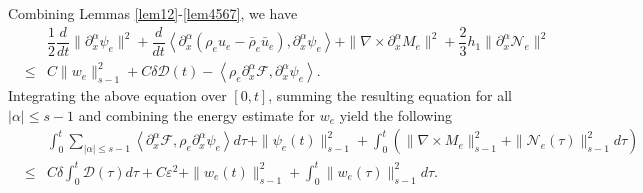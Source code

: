 \documentclass[reqno,twoside,12pt,a4paper]{amsart}
\newcommand{\eps}{\mathbb{\varepsilon}}
\newcommand{\al}{\alpha}
\newcommand{\pa}{\partial}
\newcommand{\D}{\nabla}
\newcommand{\calf}{\mathcal{F}}
\newcommand{\Ne}{\mathcal{N}_e}
\numberwithin{equation}{section}
\begin{document}
Combining Lemmas \ref{lem12}-\ref{lem4567}, we have
\begin{eqnarray*}
&&\dfrac{1}{2}\dfrac{d}{dt}\|\pa_x^\al \psi_e\|^2+\dfrac{d}{dt}\left<\partial^\al_x (\rho_e u_e-\bar{\rho}_e\bar{u}_e), \pa_x^\al\psi_e\right>+\|\D\times \pa_x^\al M_e\|^2+\dfrac{2}{3}h_1\|\pa_x^\al \Ne\|^2\nonumber\\
&\leq& C\|w_e\|_{s-1}^2+C\delta\mathcal{D}(t)-\left\langle \rho_e\pa_x^\al \calf,\partial^\al_x \psi_e\right\rangle.
\end{eqnarray*}
Integrating the above equation over $[0,t]$, summing the resulting equation for all $|\al|\leq s-1$ and combining the energy estimate for $w_e$ yield the following
\begin{eqnarray}\label{Nefinal}
    &&\int_0^t\sum_{|\al|\leq s-1}\left\langle \pa_x^\al \calf, \rho_e \partial^\al_x \psi_e\right\rangle d\tau+\|\psi_e(t)\|_{s-1}^2+\int_0^t\left(\|\D\times M_e\|_{s-1}^2+\|\Ne(\tau)\|_{s-1}^2d\tau\right)\nonumber\\
    &\leq& C\delta\int_0^t \mathcal{D}(\tau)d\tau+C\eps^2+\|w_e(t)\|_{s-1}^2+\int_0^t\|w_e(\tau)\|_{s-1
    }^2d\tau.
\end{eqnarray}
\end{document}
